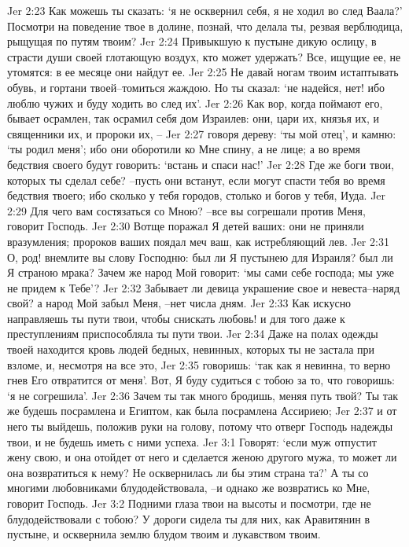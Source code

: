Jer 2:23  Как можешь ты сказать: `я не осквернил себя, я не ходил во след Ваала?' Посмотри на поведение твое в долине, познай, что делала ты, резвая верблюдица, рыщущая по путям твоим?
Jer 2:24  Привыкшую к пустыне дикую ослицу, в страсти души своей глотающую воздух, кто может удержать? Все, ищущие ее, не утомятся: в ее месяце они найдут ее.
Jer 2:25  Не давай ногам твоим истаптывать обувь, и гортани твоей--томиться жаждою. Но ты сказал: `не надейся, нет! ибо люблю чужих и буду ходить во след их'.
Jer 2:26  Как вор, когда поймают его, бывает осрамлен, так осрамил себя дом Израилев: они, цари их, князья их, и священники их, и пророки их, --
Jer 2:27  говоря дереву: `ты мой отец', и камню: `ты родил меня'; ибо они оборотили ко Мне спину, а не лице; а во время бедствия своего будут говорить: `встань и спаси нас!'
Jer 2:28  Где же боги твои, которых ты сделал себе? --пусть они встанут, если могут спасти тебя во время бедствия твоего; ибо сколько у тебя городов, столько и богов у тебя, Иуда.
Jer 2:29  Для чего вам состязаться со Мною? --все вы согрешали против Меня, говорит Господь.
Jer 2:30  Вотще поражал Я детей ваших: они не приняли вразумления; пророков ваших поядал меч ваш, как истребляющий лев.
Jer 2:31  О, род! внемлите вы слову Господню: был ли Я пустынею для Израиля? был ли Я страною мрака? Зачем же народ Мой говорит: `мы сами себе господа; мы уже не придем к Тебе'?
Jer 2:32  Забывает ли девица украшение свое и невеста--наряд свой? а народ Мой забыл Меня, --нет числа дням.
Jer 2:33  Как искусно направляешь ты пути твои, чтобы снискать любовь! и для того даже к преступлениям приспособляла ты пути твои.
Jer 2:34  Даже на полах одежды твоей находится кровь людей бедных, невинных, которых ты не застала при взломе, и, несмотря на все это,
Jer 2:35  говоришь: `так как я невинна, то верно гнев Его отвратится от меня'. Вот, Я буду судиться с тобою за то, что говоришь: `я не согрешила'.
Jer 2:36  Зачем ты так много бродишь, меняя путь твой? Ты так же будешь посрамлена и Египтом, как была посрамлена Ассириею;
Jer 2:37  и от него ты выйдешь, положив руки на голову, потому что отверг Господь надежды твои, и не будешь иметь с ними успеха.
Jer 3:1  Говорят: `если муж отпустит жену свою, и она отойдет от него и сделается женою другого мужа, то может ли она возвратиться к нему? Не осквернилась ли бы этим страна та?' А ты со многими любовниками блудодействовала, --и однако же возвратись ко Мне, говорит Господь.
Jer 3:2  Подними глаза твои на высоты и посмотри, где не блудодействовали с тобою? У дороги сидела ты для них, как Аравитянин в пустыне, и осквернила землю блудом твоим и лукавством твоим.
